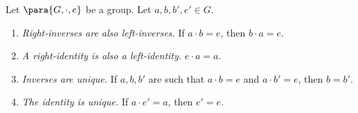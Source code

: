 \begin{proposition}
    \label{prop:inverse-identity}%
    Let \(\para{G, \cdot, e}\) be a group. Let \(a, b, b', e' \in G\).

    \begin{enumerate}
        \item \emph{Right-inverses are also left-inverses.} If \(a \cdot b = e\), then \(b \cdot a = e\).
        \item \emph{A right-identity is also a left-identity.} \(e \cdot a = a\).
        \item \emph{Inverses are unique.} If \(a, b, b'\) are such that \(a \cdot b = e\) and \(a \cdot b' = e\), then \(b = b'\).
        \item \emph{The identity is unique.} If \(a \cdot e' = a\), then \(e' = e\).
    \end{enumerate}
\end{proposition}

